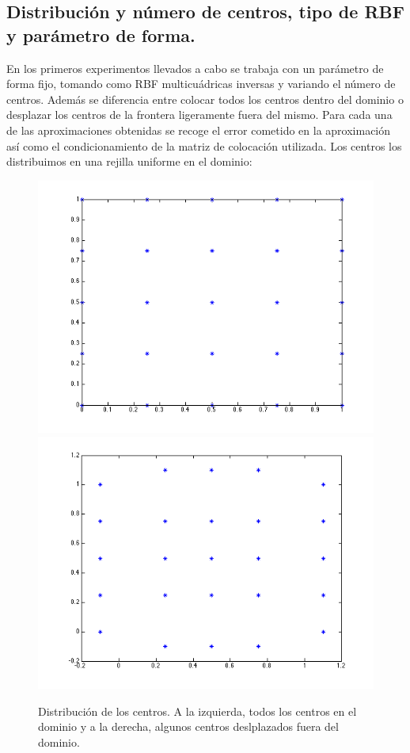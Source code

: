 \documentclass[11pt,a4paper]{article}
\begin{document}
\subsection{Distribución y número de centros, tipo de RBF y parámetro de forma.}
En los primeros experimentos llevados a cabo se trabaja con un parámetro de forma fijo, tomando como RBF  multicuádricas inversas y variando el número de centros. Además se diferencia entre colocar todos los centros dentro del dominio o desplazar los centros de la frontera ligeramente fuera del mismo. Para cada una de las aproximaciones obtenidas se recoge el error cometido en la aproximación así como el condicionamiento de la matriz de colocación utilizada. Los centros los distribuimos en una rejilla uniforme en el dominio: 
\begin{figure}[H]
\includegraphics[scale=.4]{distribucion1}
\includegraphics[scale=.4]{distribucion2}
\caption{Distribución de los centros. A la izquierda, todos los centros en el dominio y a la derecha, algunos centros deslplazados fuera del dominio. }
\end{figure} 
\end{document}
